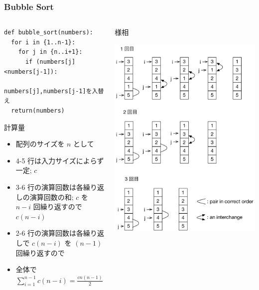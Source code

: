 \begin{frame}
\frametitle{Bubble Sort}
  \begin{columns}[t,onlytextwidth]
    \begin{column}{0.5\linewidth}
      \begin{lstlisting}[caption={擬似コード},label=bubble_sort]
def bubble_sort(numbers):
  for i in {1..n-1}:
    for j in {n..i+1}:
      if (numbers[j]<numbers[j-1]):
        numbers[j],numbers[j-1]を入替え
  return(numbers)  
      \end{lstlisting}
      \begin{itembox}[l]{計算量}
        \begin{itemize}
\tiny
\item 配列のサイズを $n$ として
\item 4-5 行は入力サイズによらず一定; $c$
\item 3-6 行の演算回数は各繰り返しの演算回数の和; $c$ を \(n-i\) 回繰り返すので \(c(n-i)\)
\item 2-6 行の演算回数は各繰り返しで \(c(n-i)\) を \((n-1)\) 回繰り返すので
\item 全体で \(\sum_{i=1}^{n-1} c(n-i)=\frac{cn(n-1)}{2}=c(\frac{n^2}{2}-\frac{n}{2})\)
        \end{itemize}
      \end{itembox}
    \end{column}
    \begin{column}{0.55\linewidth}{様相}
      \begin{center}
\includegraphics[scale=0.3]{./Figure/bubble_sort.pdf}

\end{center}
\end{column}
\end{columns}
\end{frame}
